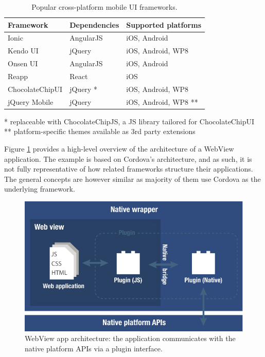 \documentclass[thesis.tex]{subfiles}
\begin{document}
\begin{table}[ht]
	\caption{Popular cross-platform mobile UI frameworks.} \label{table:cross-platform-mobile-ui-frameworks}

	\begin{center}
	\begin{tabular}{| m{3.5cm} | m{3.5cm} | m{4.75cm} |}

		\hline
		\textbf{Framework}	&	\textbf{Dependencies}		&	\textbf{Supported platforms}		\\ \hline

		Ionic				&	AngularJS					&	iOS, Android						\\ \hline
		Kendo UI			&	jQuery						&	iOS, Android, WP8					\\ \hline
		Onsen UI			&	AngularJS					&	iOS, Android						\\ \hline
		Reapp				&	React						&	iOS 								\\ \hline
		ChocolateChipUI 	&	jQuery \footnotesize{*}		&	iOS, Android, WP8					\\ \hline
		jQuery Mobile 		&	jQuery						&	iOS, Android, WP8 \footnotesize{**}	\\ \hline

	\end{tabular}
	\end{center}
	\scriptsize{*} \small{replaceable with ChocolateChipJS, a JS library tailored for ChocolateChipUI}\\
	\scriptsize{**} \small{platform-specific themes available as 3rd party extensions}
\end{table}

Figure \ref{fig:web-view-app} provides a high-level overview of the architecture of a Web\-View application. The example is based on Cordova's architecture, and as such, it is not fully representative of how related frameworks structure their applications. The general concepts are however similar as majority of them use Cordova as the underlying framework.

\begin{figure}[ht]
\centering \includegraphics[width=\textwidth]{images/web-view-app-structure}
\caption{WebView app architecture: the application communicates with the native platform APIs via a plugin interface.\label{fig:web-view-app}}
\end{figure}
\end{document}
